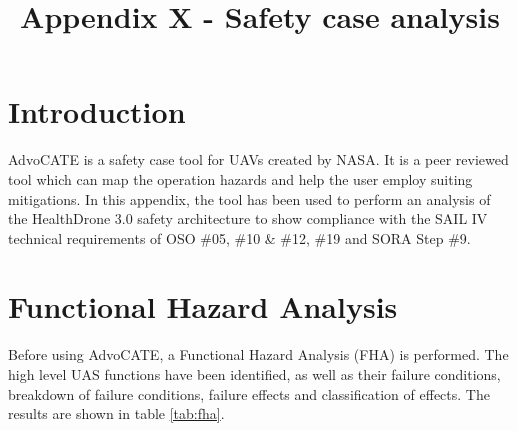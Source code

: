 \documentclass[10pt,a4paper]{report}
\begin{document}
\title{Appendix X - Safety case analysis}
\maketitle

\newcommand{\UAS}{HealthDrone 3.0 }
\newcommand{\SAIL}{SAIL IV }

\section{Introduction}
AdvoCATE is a safety case tool for UAVs created by NASA. It is a peer reviewed tool which can map the operation hazards and help the user employ suiting mitigations\cite{Denney2017, Clothier2017, Denney2018, Denney2017-2, Denney2015}. In this appendix, the tool has been used to perform an analysis of the \UAS safety architecture to show compliance with the \SAIL technical requirements of OSO \#05, \#10 \& \#12, \#19 and SORA Step \#9.

\section{Functional Hazard Analysis}
Before using AdvoCATE, a Functional Hazard Analysis (FHA) is performed. The high level UAS functions have been identified, as well as their failure conditions, breakdown of failure conditions, failure effects and classification of effects\cite{ARP4761}. The results are shown in table \ref{tab:fha}.
\end{document}
